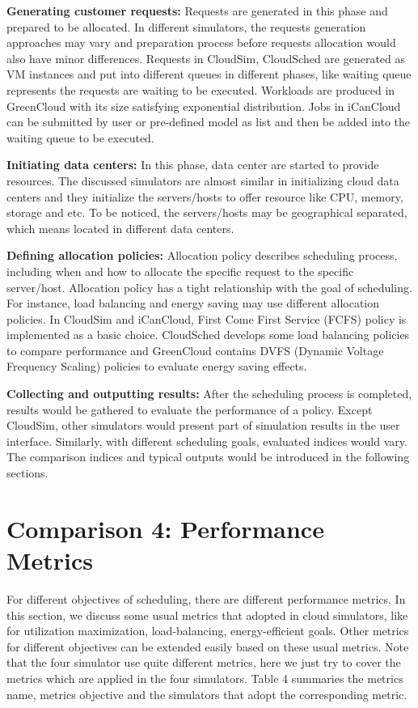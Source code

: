 \documentclass[3p, twocolumn]{elsarticle}
\begin{document}
\textbf{Generating customer requests:}
Requests are generated in this phase and prepared to be allocated. In different simulators, the requests generation approaches may vary and preparation process before requests allocation would also have minor differences. Requests in CloudSim, CloudSched are generated as VM instances and put into different queues in different phases, like waiting queue represents the requests are waiting to be executed. Workloads are produced in GreenCloud with its size satisfying exponential distribution. Jobs in iCanCloud can be submitted by user or pre-defined model as list and then be added into the waiting queue to be executed.

\textbf{Initiating data centers:}
In this phase, data center are started to provide resources. The discussed simulators are almost similar in initializing cloud data centers and they initialize the servers/hosts to offer resource like CPU, memory, storage and etc. To be noticed, the servers/hosts may be geographical separated, which means located in different data centers.

\textbf{Defining allocation policies:}
Allocation policy describes scheduling process, including when and how to allocate the specific request to the specific server/host. Allocation policy has a tight relationship with the goal of scheduling. For instance, load balancing and energy saving may use different allocation policies. In CloudSim and iCanCloud, First Come First Service (FCFS) policy is implemented as a basic choice. CloudSched develops some load balancing policies to compare performance and GreenCloud contains DVFS (Dynamic
Voltage Frequency Scaling) policies to evaluate energy saving effects.

\textbf{Collecting and outputting results:}
After the scheduling process is completed, results would be gathered to evaluate the performance of a policy. Except CloudSim, other simulators would present part of simulation results in the user interface. Similarly, with different scheduling goals, evaluated indices would vary. The comparison indices and typical outputs would be introduced in the following sections.



\section{Comparison 4: Performance Metrics}
For different objectives of scheduling, there are different performance metrics. In this section, we discuss some usual metrics that adopted in cloud simulators, like for utilization maximization, load-balancing, energy-efficient goals. Other metrics for different objectives can be extended easily based on these usual metrics. Note that the four simulator use quite different metrics, here we just try to cover the metrics which are applied in the four simulators. Table 4 summaries the metrics name, metrics objective and the simulators that adopt the corresponding metric.
\end{document}
